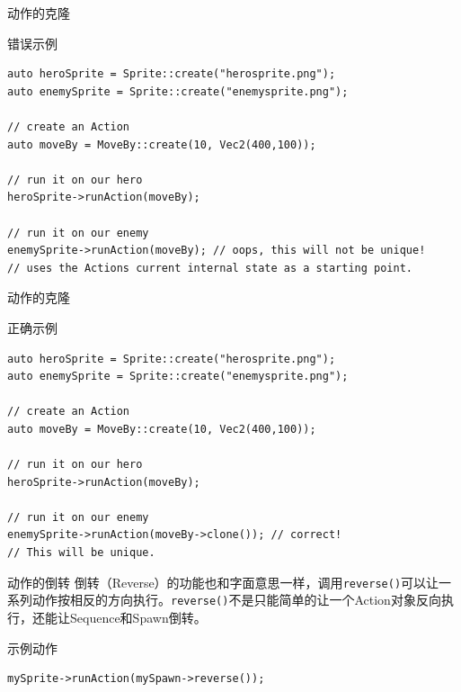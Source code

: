 \documentclass{beamer}
\begin{document}

\begin{frame}[fragile]{动作的克隆}
\begin{block}{错误示例}
\begin{verbatim}
auto heroSprite = Sprite::create("herosprite.png");
auto enemySprite = Sprite::create("enemysprite.png");

// create an Action
auto moveBy = MoveBy::create(10, Vec2(400,100));

// run it on our hero
heroSprite->runAction(moveBy);

// run it on our enemy
enemySprite->runAction(moveBy); // oops, this will not be unique!
// uses the Actions current internal state as a starting point.
\end{verbatim}
\end{block}
\end{frame}


\begin{frame}[fragile]{动作的克隆}
\begin{block}{正确示例}
\begin{verbatim}
auto heroSprite = Sprite::create("herosprite.png");
auto enemySprite = Sprite::create("enemysprite.png");

// create an Action
auto moveBy = MoveBy::create(10, Vec2(400,100));

// run it on our hero
heroSprite->runAction(moveBy);

// run it on our enemy
enemySprite->runAction(moveBy->clone()); // correct!
// This will be unique.
\end{verbatim}
\end{block}
\end{frame}


\begin{frame}[fragile]{动作的倒转}
倒转（Reverse）的功能也和字面意思一样，调用\texttt{reverse()}可以让一系列动作按相反的方向执行。\texttt{reverse()}不是只能简单的让一个Action对象反向执行，还能让Sequence和Spawn倒转。

\vspace{1em}

\begin{block}{示例动作}
\begin{verbatim}
mySprite->runAction(mySpawn->reverse());
\end{verbatim}
\end{block}
\end{frame}
\end{document}
